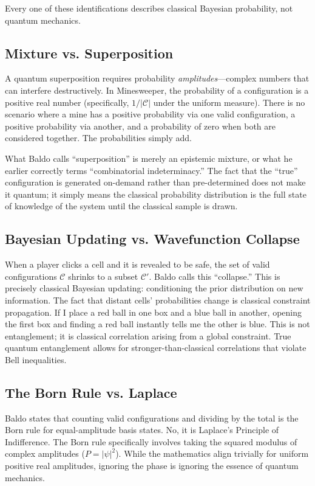 \documentclass[12pt,a4paper]{article}
\begin{document}
Every one of these identifications describes classical Bayesian probability, not quantum mechanics.

\subsection{Mixture vs. Superposition}

A quantum superposition requires probability \emph{amplitudes}---complex numbers that can interfere destructively. In Minesweeper, the probability of a configuration is a positive real number (specifically, $1/|\mathcal{C}|$ under the uniform measure). There is no scenario where a mine has a positive probability via one valid configuration, a positive probability via another, and a probability of zero when both are considered together. The probabilities simply add.

What Baldo calls ``superposition'' is merely an epistemic mixture, or what he earlier correctly terms ``combinatorial indeterminacy.'' The fact that the ``true'' configuration is generated on-demand rather than pre-determined does not make it quantum; it simply means the classical probability distribution is the full state of knowledge of the system until the classical sample is drawn.

\subsection{Bayesian Updating vs. Wavefunction Collapse}

When a player clicks a cell and it is revealed to be safe, the set of valid configurations $\mathcal{C}$ shrinks to a subset $\mathcal{C}'$. Baldo calls this ``collapse.'' This is precisely classical Bayesian updating: conditioning the prior distribution on new information. The fact that distant cells' probabilities change is classical constraint propagation. If I place a red ball in one box and a blue ball in another, opening the first box and finding a red ball instantly tells me the other is blue. This is not entanglement; it is classical correlation arising from a global constraint. True quantum entanglement allows for stronger-than-classical correlations that violate Bell inequalities.

\subsection{The Born Rule vs. Laplace}

Baldo states that counting valid configurations and dividing by the total is the Born rule for equal-amplitude basis states. No, it is Laplace's Principle of Indifference. The Born rule specifically involves taking the squared modulus of complex amplitudes ($P = |\psi|^2$). While the mathematics align trivially for uniform positive real amplitudes, ignoring the phase is ignoring the essence of quantum mechanics.
\end{document}
